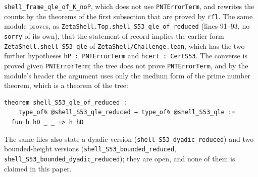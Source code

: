 \texttt{shell\_frame\_qle\_of\_K\_noP}, which does not use \texttt{PNTErrorTerm}, and rewrites the counts by the theorems of the first subsection that are
proved by \texttt{rfl}.
The same module proves, as \texttt{ZetaShell.Top.shell\_S53\_qle\_of\_reduced} (lines 91--93, no \texttt{sorry} of its own), that the
statement of record implies the earlier form \texttt{ZetaShell.shell\_S53\_qle} of \texttt{ZetaShell/Challenge.lean}, which has the two further
hypotheses \texttt{hP : PNTErrorTerm} and \texttt{hcert : CertS53}. The converse is proved given \texttt{PNTErrorTerm}; the tree does not prove
\texttt{PNTErrorTerm}, and by the module's header the argument uses only the medium form of the prime number theorem, which is a theorem of the tree:
\begin{Verbatim}[fontsize=\footnotesize,breaklines,frame=single,framesep=2mm]
theorem shell_S53_qle_of_reduced :
    type_of% @shell_S53_qle_reduced → type_of% @shell_S53_qle :=
  fun h hD _ _ => h hD
\end{Verbatim}
The same files also state a dyadic version (\texttt{shell\_S53\_dyadic\_reduced}) and two bounded-height versions (\texttt{shell\_S53\_bounded\_reduced},
\texttt{shell\_S53\_bounded\_dyadic\_reduced}); they are open, and none of them is claimed in this paper.

